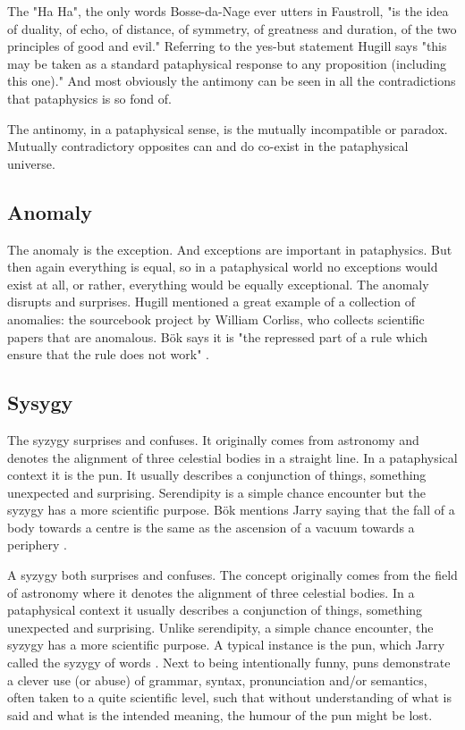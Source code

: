 The "Ha Ha", the only words Bosse-da-Nage ever utters in Faustroll, "is the idea of duality, of echo, of distance, of symmetry, of greatness and duration, of the two principles of good and evil." \citep{Hugill2012} Referring to the yes-but statement Hugill says "this may be taken as a standard pataphysical response to any proposition (including this one)." And most obviously the antimony can be seen in all the contradictions that pataphysics is so fond of.

The antinomy, in a pataphysical sense, is the mutually incompatible or paradox. Mutually contradictory opposites can and do co-exist in the pataphysical universe.

\subsection{Anomaly}

The anomaly is the exception. And exceptions are important in pataphysics. But then again everything is equal, so in a pataphysical world no exceptions would exist at all, or rather, everything would be equally exceptional. The anomaly disrupts and surprises. Hugill mentioned a great example of a collection of anomalies: the sourcebook project by William Corliss, who collects scientific papers that are anomalous. Bök says it is "the repressed part of a rule which ensure that the rule does not work" \citep[p.38]{Bok2002}.

\subsection{Sysygy}

The syzygy surprises and confuses. It originally comes from astronomy and denotes the alignment of three celestial bodies in a straight line. In a pataphysical context it is the pun. It usually describes a conjunction of things, something unexpected and surprising. Serendipity is a simple chance encounter but the syzygy has a more scientific purpose. Bök mentions Jarry saying that the fall of a body towards a centre is the same as the ascension of a vacuum towards a periphery \citep[p.42]{Bok2002}.

A syzygy both surprises and confuses. The concept originally comes from the field of astronomy where it denotes the alignment of three celestial bodies. In a pataphysical context it usually describes a conjunction of things, something unexpected and surprising. Unlike serendipity, a simple chance encounter, the syzygy has a more scientific purpose. A typical instance is the pun, which Jarry called the syzygy of words \citep{Jarry1996}. Next to being intentionally funny, puns demonstrate a clever use (or abuse) of grammar, syntax, pronunciation and/or semantics, often taken to a quite scientific level, such that without understanding of what is said and what is the intended meaning, the humour of the pun might be lost.

